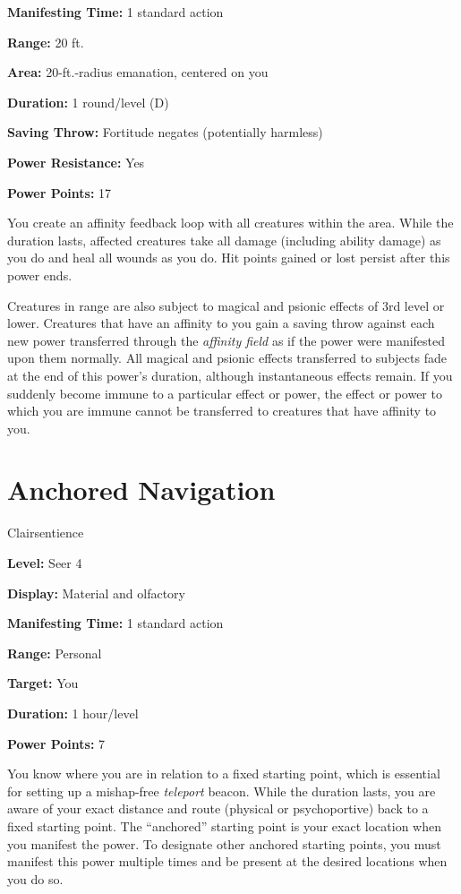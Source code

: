 \documentclass{article}
\begin{document}
\textbf{Manifesting Time:} 1 standard action

\textbf{Range:} 20 ft.

\textbf{Area:} 20-ft.-radius emanation, centered on you

\textbf{Duration:} 1 round/level (D)

\textbf{Saving Throw:} Fortitude negates (potentially harmless)

\textbf{Power Resistance:} Yes

\textbf{Power Points:} 17

You create an affinity feedback loop with all creatures within the area. While 
the duration lasts, affected creatures take all damage (including ability damage) 
as you do and heal all wounds as you do. Hit points gained or lost persist after 
this power ends.

Creatures in range are also subject to magical and psionic effects of 3rd level 
or lower. Creatures that have an affinity to you gain a saving throw against each 
new power transferred through the \textit{affinity field }as if the power were 
manifested upon them normally. All magical and psionic effects transferred to subjects 
fade at the end of this power's duration, although instantaneous effects remain. 
If you suddenly become immune to a particular effect or power, the effect or power 
to which you are immune cannot be transferred to creatures that have affinity to 
you.

\vspace{12pt}
\section*{Anchored Navigation}

Clairsentience

\textbf{Level:} Seer 4

\textbf{Display:} Material and olfactory

\textbf{Manifesting Time:} 1 standard action

\textbf{Range:} Personal

\textbf{Target:} You

\textbf{Duration:} 1 hour/level

\textbf{Power Points:} 7

You know where you are in relation to a fixed starting point, which is essential 
for setting up a mishap-free \textit{teleport }beacon. While the duration lasts, 
you are aware of your exact distance and route (physical or psychoportive) back 
to a fixed starting point. The ``anchored'' starting point is your exact location 
when you manifest the power. To designate other anchored starting points, you must 
manifest this power multiple times and be present at the desired locations when 
you do so.
\end{document}
